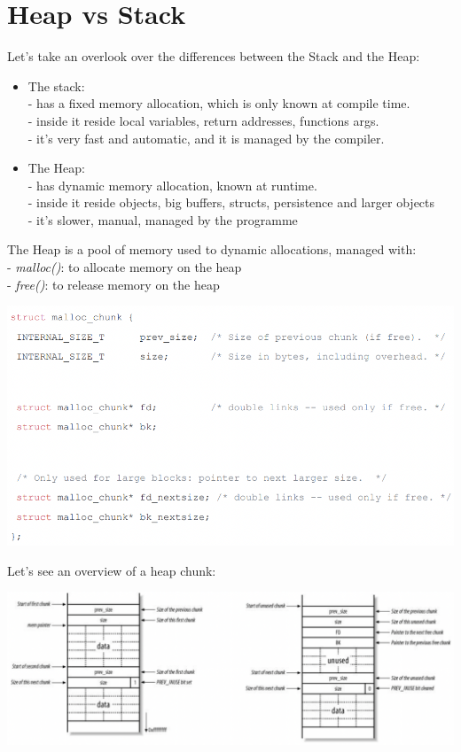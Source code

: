 \documentclass[11pt, oneside]{article}   	%
\begin{document}
\section*{Heap vs Stack}
Let's take an overlook over the differences between the Stack and the Heap:
\begin{itemize}
\item The stack:\\
- has a fixed memory allocation, which is only known at compile time.\\
- inside it reside local variables, return addresses, functions args.\\
- it's very fast and automatic, and it is managed by the compiler.
\item The Heap:\\
- has dynamic memory allocation, known at runtime.\\
- inside it reside objects, big buffers, structs, persistence and larger objects\\
- it's slower, manual, managed by the programme
\end{itemize}
The Heap is a pool of memory used to dynamic allocations, managed with:\\
- \emph{malloc()}: to allocate memory on the heap\\
- \emph{free()}: to release memory on the heap\\\begin{center}
\includegraphics[scale = 0.6]{heap}
\end{center}
Let's see an overview of a heap chunk:
\begin{center}
\includegraphics[scale = 0.6]{heap2}
\end{center}
\end{document}
